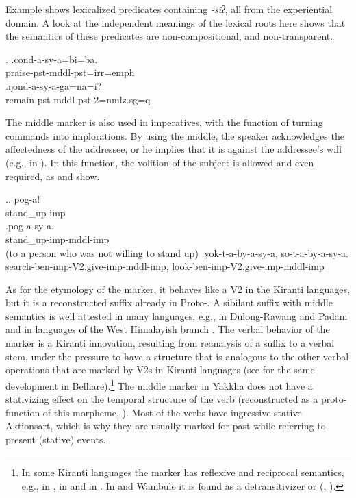 Example \Next shows lexicalized predicates containing \emph{-siʔ}, all from the experiential domain. A look at the independent meanings of the lexical roots here shows that the semantics of these predicates are non-compositional, and non-transparent.

\ex. \ag.cond-a-sy-a=bi=ba.\\
		praise{\sc [3sg]-pst-mddl-pst=irr=emph}\\
	  
 	\bg.ŋond-a-sy-a-ga=na=i?\\
	remain-{\sc pst-mddl-pst-2=nmlz.sg=q}	\\


The middle marker is also used in imperatives, with the function of turning commands into implorations. By using the middle, the speaker acknowledges the affectedness of the addressee, or he implies that it is against the addressee's will (e.g., in \Next[b]). In this function, the volition of the subject is allowed and even  required, as \Next[b] and \Next[c] show. 

	 \ex.\ag. pog-a!\\
	stand\_up-{\sc imp}\\
	 \bg.pog-a-sy-a.\\
	stand\_up-{\sc imp-mddl-imp}\\
	  (to a person who was not willing to stand up)
\bg.yok-t-a-by-a-sy-a, so-t-a-by-a-sy-a.\\
		search-{\sc ben-imp-V2.give-imp-mddl-imp}, look{\sc -ben-imp-V2.give-imp-mddl-imp}\\
	 
 

As for the etymology of the marker, it behaves like a V2 in the Kiranti languages, but it is a reconstructed suffix already in Proto-. A sibilant suffix with middle semantics is well attested in many  languages, e.g., in Dulong-Rawang and Padam \citep[1944]{LaPolla1996_Middle} and in languages of the West Himalayish branch \citep[471]{Matisoff2003Handbook}. The verbal behavior of the marker is a Kiranti innovation, resulting from reanalysis of a suffix to a verbal stem, under the pressure to have a structure that is analogous to the other verbal operations that are marked by V2s in Kiranti languages (see \citet[560]{Bickel2003Belhare} for the same development in Belhare).\footnote{In some Kiranti languages the marker has reflexive and reciprocal semantics, e.g., in  \citep[86]{Driem1987A-grammar}, in  \citep[61]{Tolsma1999A-grammar} and in  \citep[300]{Bickeletal2010Ditransitives}. In  and Wambule it is found as a detransitivizer or  (\citet[209]{Lahaussois2003_Thulung}, \citet[351]{Opgenort2004A-Grammar}).}  The middle marker in Yakkha does not have a stativizing effect on the temporal structure of the verb (reconstructed as a proto-function of this morpheme, \citet[471]{Matisoff2003Handbook}). Most of the verbs have ingressive-stative Aktionsart, which is why they are usually marked for past while referring to present (stative) events.

